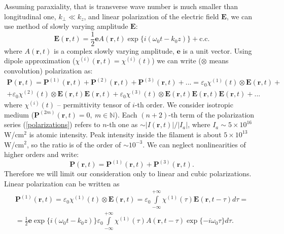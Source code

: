 \documentclass[a4paper, 12pt]{article}
\begin{document}
Assuming paraxiality, that is transverse wave number is much smaller than longitudinal one, $k_\perp \ll k_z$, and linear polarization of the electric field $\mathbf{E}$, we can use method of slowly varying amplitude $\mathbf{E}$:
\begin{equation}
\mathbf{E}(\mathbf{r}, t) = \frac1{2}\mathbf{e} A(\mathbf{r}, t) \exp\{i (\omega_0 t - k_0 z)\} + \text{c.c.}
\end{equation}
where $A(\mathbf{r}, t)$ is a complex slowly varying amplitude, $\mathbf{e}$ is a unit vector.
Using dipole approximation ($\chi^{(i)}(\mathbf{r},t) = \chi^{(i)}(t)$) we can write ($\otimes$ means convolution) polarization as:
\begin{multline}
\label{polarizations}
\mathbf{P}(\mathbf{r}, t) = \mathbf{P}^{(1)}(\mathbf{r}, t) + \mathbf{P}^{(2)}(\mathbf{r}, t) + \mathbf{P}^{(3)}(\mathbf{r}, t) + ... = \varepsilon_0 \chi^{(1)}(t) \otimes \mathbf{E}(\mathbf{r}, t) +\\+ \varepsilon_0  \chi^{(2)}(t) \otimes \mathbf{E}(\mathbf{r}, t) \mathbf{E}(\mathbf{r}, t) + \varepsilon_0  \chi^{(3)}(t) \otimes \mathbf{E}(\mathbf{r}, t) \mathbf{E}(\mathbf{r}, t) \mathbf{E}(\mathbf{r}, t) + ...
\end{multline}
where $\chi^{(i)}(t)$ -- permittivity tensor of $i$-th order. We consider isotropic medium ($\mathbf{P}^{(2 m)}(\mathbf{r}, t)=0, \ m \in \mathbb{N}$). Each $(n+2)$-th term of the polarization series (\ref{polarizations}) refers to $n$-th one as $\sim \bigl|I(\mathbf{r}, t) \bigr| \bigl/ \bigl|I_a \bigr|$, where $I_a \sim 5 \times 10^{16}$ W/cm$^2$ is atomic intensity. Peak intensity inside the filament is about $5 \times 10^{13}$ W/cm$^2$, so the ratio is of the order of $\sim 10^{-3}$. We can neglect nonlinearities of higher orders and write:
\begin{equation}
\mathbf{P}(\mathbf{r}, t) = \mathbf{P}^{(1)}(\mathbf{r}, t) + \mathbf{P}^{(3)}(\mathbf{r}, t).
\end{equation}
Therefore we will limit our consideration only to linear and cubic polarizations. Linear polarization can be written as
\begin{multline}
\mathbf{P}^{(1)}(\mathbf{r}, t) = \varepsilon_0 \chi^{(1)}(t) \otimes \mathbf{E}(\mathbf{r}, t) =
\varepsilon_0 \int\limits_{-\infty}^{+\infty} \chi^{(1)}(\tau) \mathbf{E}(\mathbf{r}, t - \tau) d\tau =\\= \frac1{2}\mathbf{e} \exp\{i (\omega_0 t  - k_0 z)\} \varepsilon_0 \int\limits_{-\infty}^{+\infty} \chi^{(1)}(\tau)  A(\mathbf{r}, t - \tau) \exp\{-i \omega_0 \tau \} d\tau.
\end{multline}
\end{document}
